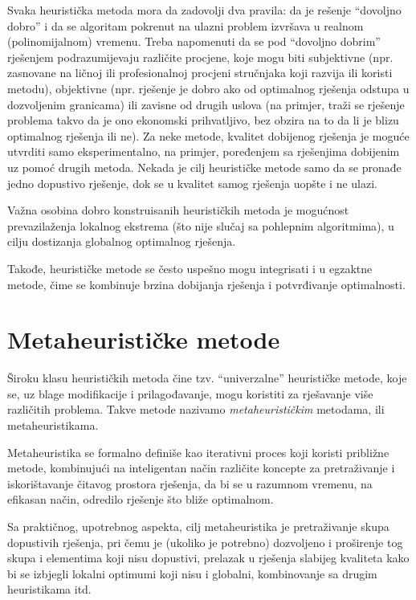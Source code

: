 \documentclass[a4paper, utf8, 11pt, colorlinks]{book}
\begin{document}
 
 Svaka heuristička metoda mora da zadovolji dva pravila: da je rešenje ``dovoljno
 dobro'' i da se algoritam pokrenut na ulazni problem izvršava u realnom (polinomijalnom) vremenu. Treba napomenuti da se pod  ``dovoljno
 dobrim'' rješenjem podrazumijevaju različite procjene, koje mogu biti subjektivne (npr. zasnovane na ličnoj ili profesionalnoj procjeni stručnjaka koji razvija ili koristi metodu), objektivne (npr.  rješenje je dobro ako od optimalnog rješenja odstupa u dozvoljenim granicama) ili zavisne od drugih uslova (na primjer, traži se rješenje problema takvo da je ono ekonomski prihvatljivo, bez obzira na to da li je blizu optimalnog rješenja ili ne). 
 Za neke metode, kvalitet dobijenog rješenja je moguće utvrditi samo eksperimentalno, na primjer, poređenjem sa rješenjima dobijenim uz pomoć drugih metoda. Nekada je cilj heurističke metode samo da se pronađe jedno dopustivo rješenje, dok se u kvalitet samog rješenja uopšte i ne ulazi.
 
 Važna osobina dobro konstruisanih heurističkih metoda je mogućnost prevazilaženja lokalnog ekstrema (što nije slučaj sa pohlepnim algoritmima), u cilju dostizanja globalnog optimalnog rješenja. 
 
 Takođe, heurističke metode se često uspešno mogu integrisati i u egzaktne metode, čime se kombinuje brzina dobijanja rješenja i potvrđivanje optimalnosti.
 
 \section{Metaheurističke metode}
 
 Široku klasu heurističkih metoda čine tzv. ``univerzalne'' heurističke metode, koje se, uz blage modifikacije i prilagođavanje, mogu koristiti za rješavanje više različitih problema. Takve metode nazivamo \emph{metaheurističkim} metodama, ili metaheuristikama.  
 
 Metaheuristika se formalno definiše kao iterativni proces koji koristi približne metode, kombinujući na inteligentan način različite koncepte za pretraživanje i iskorištavanje čitavog prostora rješenja, da bi se u razumnom vremenu, na efikasan način, odredilo rješenje što bliže optimalnom.
 
 Sa praktičnog, upotrebnog aspekta, cilj metaheuristika je pretraživanje skupa dopustivih rješenja, pri čemu je (ukoliko je potrebno) dozvoljeno i proširenje tog skupa i elementima koji nisu dopustivi, prelazak u rješenja slabijeg kvali\-teta kako bi se izbjegli lokalni optimumi koji nisu i globalni, kombinovanje sa drugim heuristikama itd.
 
\end{document}

